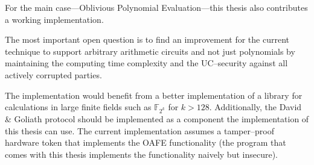 For the main case---Oblivious Polynomial Evaluation---this thesis also
contributes a working implementation.


%
%
\label{sec:outlook}

The most important open question is to find an improvement for the current
technique to support arbitrary arithmetic circuits and not just polynomials by
maintaining the computing time complexity and the UC--security against all
actively corrupted parties.

The implementation would benefit from a better implementation of a library for
calculations in large finite fields such as $\mathbb{F}_{2^{k}}$ for $k > 128$.
Additionally, the David \& Goliath protocol \cite{davidgoliath} should be
implemented as a component the implementation of this thesis can use. The
current implementation assumes a tamper--proof hardware token that implements
the OAFE functionality (the program \JWBtoken{} that comes with this thesis
implements the functionality naively but insecure).

